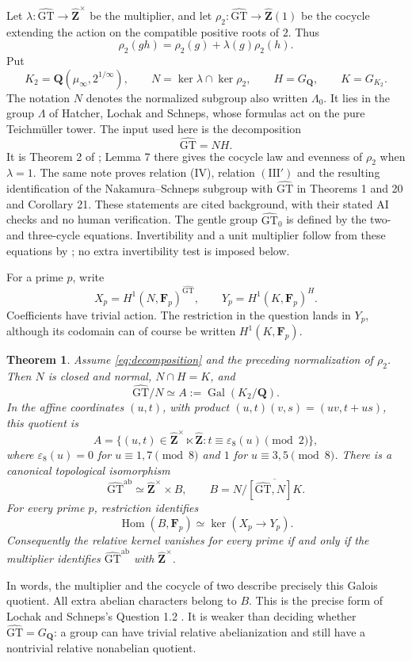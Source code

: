 \documentclass[11pt,a4paper]{article}
\newtheorem{theorem}{Theorem}[section]
\theoremstyle{definition}
\theoremstyle{remark}
\newcommand{\GT}{\widehat{\mathrm{GT}}}
\newcommand{\GTz}{\widehat{\mathrm{GT}}_0}
\newcommand{\Zh}{\widehat{\mathbf Z}}
\newcommand{\Q}{\mathbf Q}
\newcommand{\F}{\mathbf F}
\newcommand{\GQ}{G_{\Q}}
\newcommand{\ab}{\mathrm{ab}}
\DeclareMathOperator{\Hom}{Hom}
\DeclareMathOperator{\Gal}{Gal}
\begin{document}
Let $\lambda:\GT\to\Zh^\times$ be the multiplier, and let
$\rho_2:\GT\to\Zh(1)$ be the cocycle extending the action on the compatible positive roots of $2$. Thus
\[
 \rho_2(gh)=\rho_2(g)+\lambda(g)\rho_2(h).
\]
Put
\[
 K_2=\Q(\mu_\infty,2^{1/\infty}),\qquad
 N=\ker\lambda\cap\ker\rho_2,\qquad H=\GQ,\qquad K=G_{K_2}.
\]
The notation $N$ denotes the normalized subgroup also written $\Lambda_0$. It lies in the group $\Lambda$ of Hatcher, Lochak and Schneps, whose formulas act on the pure Teichm\"uller tower. The input used here is the decomposition
\begin{equation}\label{eq:decomposition}
 \GT=NH.
\end{equation}
It is Theorem 2 of \cite{H17}; Lemma 7 there gives the cocycle law and evenness of $\rho_2$ when $\lambda=1$. The same note proves relation (IV), relation $(\mathrm{III}')$ and the resulting identification of the Nakamura--Schneps subgroup with $\GT$ in Theorems 1 and 20 and Corollary 21. These statements are cited background, with their stated AI checks and no human verification. The gentle group $\GTz$ is defined by the two- and three-cycle equations. Invertibility and a unit multiplier follow from these equations by \cite[Theorems A and E]{Monoid}; no extra invertibility test is imposed below.

For a prime $p$, write
\[
 X_p=H^1(N,\F_p)^{\GT},\qquad
 Y_p=H^1(K,\F_p)^H.
\]
Coefficients have trivial action. The restriction in the question lands in $Y_p$, although its codomain can of course be written $H^1(K,\F_p)$.

\begin{theorem}\label{thm:main-structural}
Assume \eqref{eq:decomposition} and the preceding normalization of $\rho_2$. Then $N$ is closed and normal, $N\cap H=K$, and
\[
 \GT/N\simeq A:=\Gal(K_2/\Q).
\]
In the affine coordinates $(u,t)$, with product
$(u,t)(v,s)=(uv,t+us)$, this quotient is
\[
 A=\{(u,t)\in\Zh^\times\ltimes\Zh:
 t\equiv\varepsilon_8(u)\pmod2\},
\]
where $\varepsilon_8(u)=0$ for $u\equiv1,7\pmod8$ and $1$ for $u\equiv3,5\pmod8$.
There is a canonical topological isomorphism
\[
 \GT^{\ab}\simeq\Zh^\times\times B,\qquad
 B=N/\overline{[\GT,N]K}.
\]
For every prime $p$, restriction identifies
\[
 \Hom(B,\F_p)\simeq\ker(X_p\longrightarrow Y_p).
\]
Consequently the relative kernel vanishes for every prime if and only if the multiplier identifies $\GT^{\ab}$ with $\Zh^\times$.
\end{theorem}

In words, the multiplier and the cocycle of two describe precisely this Galois quotient. All extra abelian characters belong to $B$. This is the precise form of Lochak and Schneps's Question 1.2 \cite[\S1, Question 1.2]{LS2006}. It is weaker than deciding whether $\GT=\GQ$: a group can have trivial relative abelianization and still have a nontrivial relative nonabelian quotient.
\end{document}
